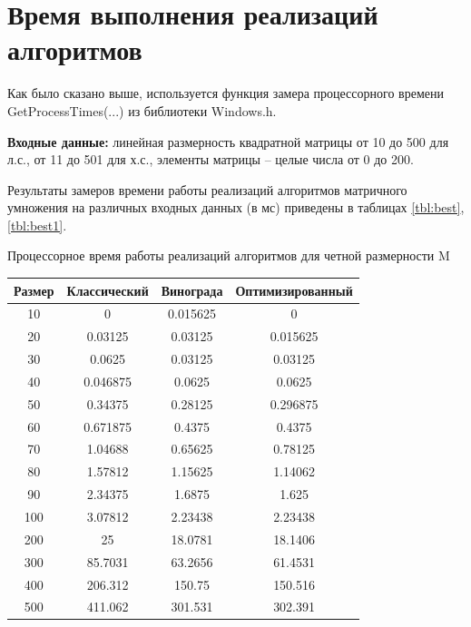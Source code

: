 \section{Время выполнения реализаций алгоритмов}

Как было сказано выше, используется функция замера процессорного времени GetProcessTimes(...) из библиотеки Windows.h. 

\textbf{Входные данные:} линейная размерность квадратной матрицы от 10 до 500 для л.с., от 11 до 501 для х.с., элементы матрицы -- целые числа от 0 до 200.

Результаты замеров времени работы реализаций алгоритмов матричного умножения на различных входных данных (в мс) приведены в таблицах \ref{tbl:best}, \ref{tbl:best1}.


\begin{center}
	\begin{threeparttable}
		\caption{Процессорное время работы реализаций алгоритмов для четной размерности M}
		\label{tbl:best}
		\begin{tabular}{|c|c|c|c|}
			\hline
			Размер & Классический &  Винограда &  Оптимизированный\\
			\hline
			10 & 0  &  0.015625 &0  \\ 
			\hline
			20 &0.03125  &      0.03125 &      0.015625\\ 
			\hline
			30 &  0.0625        &0.03125  &      0.03125 \\ 
			\hline
			40 &  0.046875     &    0.0625 &        0.0625  \\ 
			\hline
			50 & 0.34375      &  0.28125    &   0.296875  \\ 
			\hline
			60 & 0.671875    &     0.4375    &     0.4375 \\ 
			\hline
			70 &  1.04688   &     0.65625     &   0.78125 \\ 
			\hline
			80 & 1.57812   &     1.15625       & 1.14062 \\ 
			\hline
			90 & 2.34375  &       1.6875        &  1.625 \\ 
			\hline
			100 & 3.07812&        2.23438        &2.23438 \\ 
			\hline
			200 & 25 &       18.0781      &  18.1406\\ 
			\hline
			300 &  85.7031    &    63.2656 &       61.4531 \\ 
			\hline
			400 &  206.312   &      150.75  &      150.516  \\ 
			\hline
			500 &  411.062  &      301.531   &     302.391  \\ 
			\hline
		\end{tabular}
		

\end{threeparttable}
\end{center}
